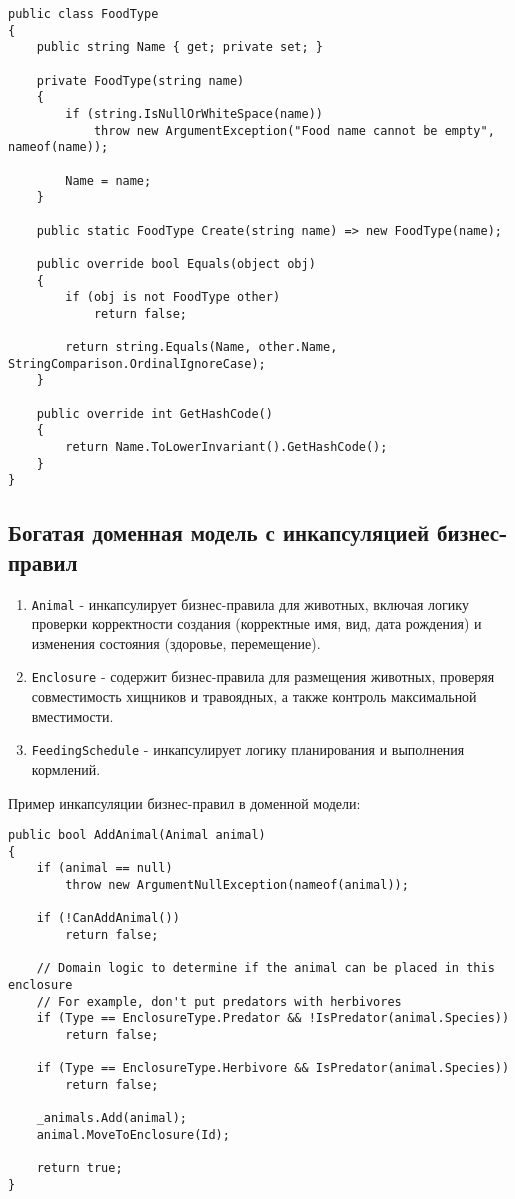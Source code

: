 \documentclass[a4paper,12pt]{article}
\begin{document}
\begin{lstlisting}[style=csharpstyle]
public class FoodType
{
    public string Name { get; private set; }
    
    private FoodType(string name)
    {
        if (string.IsNullOrWhiteSpace(name))
            throw new ArgumentException("Food name cannot be empty", nameof(name));
            
        Name = name;
    }
    
    public static FoodType Create(string name) => new FoodType(name);
    
    public override bool Equals(object obj)
    {
        if (obj is not FoodType other)
            return false;
            
        return string.Equals(Name, other.Name, StringComparison.OrdinalIgnoreCase);
    }
    
    public override int GetHashCode()
    {
        return Name.ToLowerInvariant().GetHashCode();
    }
}
\end{lstlisting}

\subsection{Богатая доменная модель с инкапсуляцией бизнес-правил}

\begin{enumerate}
    \item \texttt{Animal} - инкапсулирует бизнес-правила для животных, включая логику проверки корректности создания (корректные имя, вид, дата рождения) и изменения состояния (здоровье, перемещение).
    \item \texttt{Enclosure} - содержит бизнес-правила для размещения животных, проверяя совместимость хищников и травоядных, а также контроль максимальной вместимости.
    \item \texttt{FeedingSchedule} - инкапсулирует логику планирования и выполнения кормлений.
\end{enumerate}

Пример инкапсуляции бизнес-правил в доменной модели:

\begin{lstlisting}[style=csharpstyle]
public bool AddAnimal(Animal animal)
{
    if (animal == null)
        throw new ArgumentNullException(nameof(animal));
        
    if (!CanAddAnimal())
        return false;
        
    // Domain logic to determine if the animal can be placed in this enclosure
    // For example, don't put predators with herbivores
    if (Type == EnclosureType.Predator && !IsPredator(animal.Species))
        return false;
        
    if (Type == EnclosureType.Herbivore && IsPredator(animal.Species))
        return false;
        
    _animals.Add(animal);
    animal.MoveToEnclosure(Id);
    
    return true;
}
\end{lstlisting}
\end{document}
